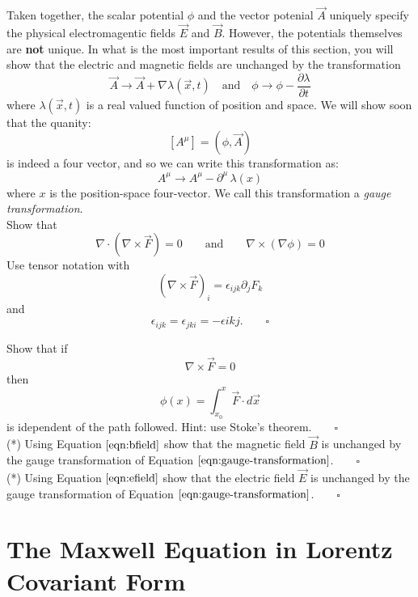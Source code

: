 \documentclass[12pt]{article}
\begin{document}
\noindent
Taken together, the scalar potential $\phi$ and the vector potenial
$\vec{A}$ uniquely specify the physical electromagentic fields
$\vec{E}$ and $\vec{B}$.  However, the potentials themselves are {\bf
  not} unique.  In what is the most important results of this section,
you will show that the electric and magnetic fields are unchanged by the transformation
$$\vec{A} \to \vec{A} + \nabla \lambda(\vec{x},t) \quad \text{and} \quad \phi \to \phi - \frac{\partial \lambda}{\partial t}$$
where $\lambda(\vec{x},t)$ is a real valued function of position and space.  We will show soon that the quanity:
$$[A^\mu] = (\phi, \vec{A})$$
is indeed a four vector, and so we can write this transformation as:
\begin{equation}
\label{eqn:gauge-transformation}
A^\mu \to A^\mu - \partial^\mu \, \lambda(x)
\end{equation}
where $x$ is the position-space four-vector.  We call this transformation a {\it gauge transformation}.\\[5pt]

\exercise Show that
\begin{equation*}
\nabla \cdot \left( \nabla \times \vec{F} \right) = 0 \qquad \text{and} \qquad \nabla \times \left(\nabla \phi \right) = 0
\end{equation*}
Use tensor notation with
$$(\nabla \times \vec{F})_i = \epsilon_{ijk}\partial_j F_k$$
and
$$\epsilon_{ijk} = \epsilon_{jki} = -\epsilon{ikj}. \qquad \square$$

\exercise Show that if
$$\nabla \times \vec{F} = 0$$
then
$$\phi(x) = \int_{x_0}^x \vec{F} \cdot d\vec{x}$$
is idependent of the path followed.  Hint: use Stoke's theorem.$\qquad \square$\\[5pt]

\exercise (*) Using Equation $\ref{eqn:bfield}$ show that the magnetic
field $\vec{B}$ is unchanged by the gauge transformation of Equation
$\ref{eqn:gauge-transformation}$.$\qquad \square$\\[5pt]

\exercise (*) Using Equation $\ref{eqn:efield}$ show that the electric
field $\vec{E}$ is unchanged by the gauge transformation of Equation
$\ref{eqn:gauge-transformation}$.$\qquad \square$\\[5pt]

\section{The Maxwell Equation in Lorentz Covariant Form}
\end{document}
